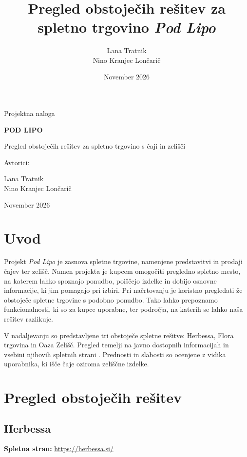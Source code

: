 \documentclass[12pt,a4paper]{article}
\title{Pregled obstoječih rešitev za spletno trgovino \textit{Pod Lipo}}
\author{Lana Tratnik \\ Nino Kranjec Lončarič}
\date{November 2026}
\begin{document}
\begin{titlepage}
  \centering
  \vspace*{2.5cm}
  {\Large Projektna naloga\par}
  \vspace{1.8cm}
  {\huge\bfseries POD LIPO\par}
  \vspace{0.5cm}
  {\Large Pregled obstoječih rešitev za spletno trgovino s čaji in zelišči\par}
  \vspace{2.2cm}
  {\large Avtorici:\par}
  \vspace{0.3cm}
  {\large Lana Tratnik\\ Nino Kranjec Lončarič\par}
  \vfill
  {\large November 2026\par}
\end{titlepage}

\tableofcontents
\newpage

\section{Uvod}
Projekt \textit{Pod Lipo} je zasnova spletne trgovine, namenjene predstavitvi in prodaji čajev ter zelišč. Namen projekta je kupcem omogočiti pregledno spletno mesto, na katerem lahko spoznajo ponudbo, poiščejo izdelke in dobijo osnovne informacije, ki jim pomagajo pri izbiri. Pri načrtovanju je koristno pregledati že obstoječe spletne trgovine s podobno ponudbo. Tako lahko prepoznamo funkcionalnosti, ki so za kupce uporabne, ter področja, na katerih se lahko naša rešitev razlikuje.

V nadaljevanju so predstavljene tri obstoječe spletne rešitve: Herbessa, Flora trgovina in Oaza Zelišč. Pregled temelji na javno dostopnih informacijah in vsebini njihovih spletnih strani \cite{herbessa,flora,oaza}. Prednosti in slabosti so ocenjene z vidika uporabnika, ki išče čaje oziroma zeliščne izdelke.

\section{Pregled obstoječih rešitev}

\subsection{Herbessa}
\textbf{Spletna stran:} \url{https://herbessa.si/}
\end{document}
